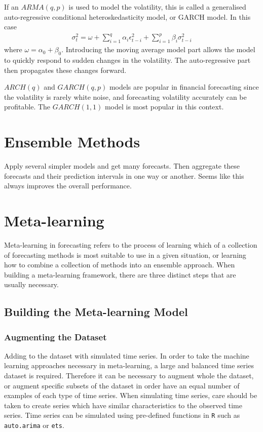 \documentclass[a4paper,12pt]{article}
\theoremstyle{definition}
\begin{document}
If an $ARMA(q,p)$ is used to model the volatility, this is called a generalised auto-regressive conditional heteroskedasticity model, or GARCH model. In this case
\begin{align}
	\sigma^2_t = \omega + \sum_{i=1}^q \alpha_i \epsilon_{t-i}^2 + \sum_{i=1}^p \beta_i \sigma^2_{t-i}
\end{align}
where $\omega = \alpha_0 + \beta_0$. Introducing the moving average model part allows the model to quickly respond to sudden changes in the volatility. The auto-regressive part then propagates these changes forward. 

$ARCH(q)$ and $GARCH(q,p)$ models are popular in financial forecasting since the volatility is rarely white noise, and forecasting volatility accurately can be profitable. The $GARCH(1,1)$ model is most popular in this context.

\section{Ensemble Methods}
Apply several simpler models and get many forecasts. Then aggregate these forecasts and their prediction intervals in one way or another. Seems like this always improves the overall performance.

\section{Meta-learning}
Meta-learning in forecasting refers to the process of learning which of a collection of forecasting methods is most suitable to use in a given situation, or learning how to combine a collection of methods into an ensemble approach. When building a meta-learning framework, there are three distinct steps that are usually necessary.
\subsection{Building the Meta-learning Model}
\subsubsection{Augmenting the Dataset}
Adding to the dataset with simulated time series. In order to take the machine learning approaches necessary in meta-learning, a large and balanced time series dataset is required. Therefore it can be necessary to augment whole the dataset, or augment specific subsets of the dataset in order have an equal number of examples of each type of time series. When simulating time series, care should be taken to create series which have similar characteristics to the observed time series. Time series can be simulated using pre-defined functions in \texttt{R} such as \texttt{auto.arima} or \texttt{ets}.
\end{document}
